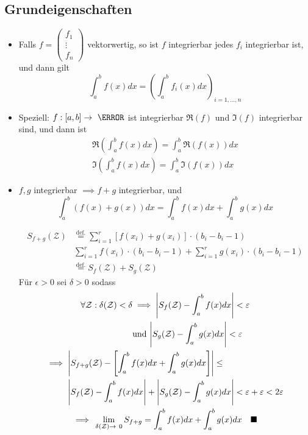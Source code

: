 \subsection{Grundeigenschaften}
\begin{itemize}
	\item Falls $f = \begin{pmatrix}f_1 \\ \vdots \\ f_n\end{pmatrix}$ vektorwertig, so ist $f$ integrierbar \gdw jedes $f_i$ integrierbar  ist, und dann gilt
		\[ \int_a^b f(x) dx = \left( \int_a^b f_i(x) dx \right)_{i=1, \dotsc , n} \]
	\item Speziell: $f: [a,b] \rightarrow \C$ ist integrierbar \gdw $\Re(f)$ und $\Im(f)$ integrierbar sind, und dann ist
		\begin{gather*}
			\Re\left( \int_a^b f(x) dx \right) = \int_a^b \Re(f(x)) dx \\
			\Im\left( \int_a^b f(x) dx \right) = \int_a^b \Im(f(x)) dx
		\end{gather*}
	\item $f, g$ integrierbar $\implies f + g$ integrierbar, und
		\[ \int_a^b (f(x) + g(x)) dx = \int_a^b f(x) dx + \int_a^b g(x) dx \]
		\begin{bew}
			\[ \begin{split}
				S_{f+g}(\mathcal{Z})	&\overset{\text{def.}}{=} \sum_{i=1}^r [f(x_i) + g(x_i)] \cdot (b_i - b_i-1) \\
								&\sum_{i=1}^r f(x_i) \cdot (b_i - b_i-1) + \sum_{i=1}^r g(x_i) \cdot (b_i - b_i-1) \\
								&\overset{\text{def.}}{=} S_{f}(\mathcal{Z}) + S_{g}(\mathcal{Z})
			\end{split} \]
			Für $\epsilon > 0$ sei $\delta > 0$ sodass
			\begin{gather*}
				\begin{split}
					\forall \mathcal{Z} : \delta(\mathcal{Z}) < \delta	&\implies \abs{S_f(\mathcal{Z}) - \int_a^b f(x) dx} < \epsilon \\
														&\text{und } \abs{S_g(\mathcal{Z}) - \int_a^b g(x) dx} < \epsilon
				\end{split} \\
				\begin{split}
					\implies	&\abs{S_{f+g}(\mathcal{Z}) - \left[ \int_a^b f(x) dx + \int_a^b g(x) dx \right] } \leq \\
							&\abs{S_f(\mathcal{Z}) - \int_a^b f(x) dx} + \abs{S_g(\mathcal{Z}) - \int_a^b g(x) dx} < \epsilon + \epsilon < 2 \epsilon
				\end{split} \\
				\implies \lim_{\delta(\mathcal{Z}) \rightarrow 0} S_{f+g} = \int_a^b f(x) dx + \int_a^b g(x) dx \quad \blacksquare
			\end{gather*}
		\end{bew}
\end{itemize}

